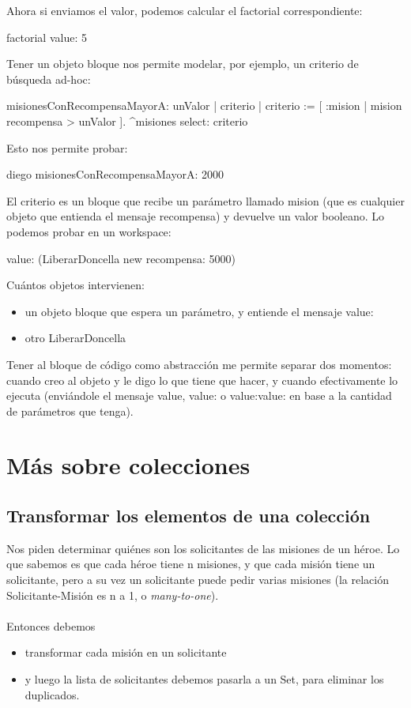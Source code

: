 \documentclass[a4paper,12pt]{book}
\begin{document}
Ahora si enviamos el valor, podemos calcular el factorial correspondiente:

\begin{code}
factorial value: 5
\end{code}

Tener un objeto bloque nos permite modelar, por ejemplo, un criterio de búsqueda ad-hoc:

\begin{code}
misionesConRecompensaMayorA: unValor
  | criterio |
  criterio := [ :mision | mision recompensa > unValor ].
  ^misiones select: criterio 
\end{code}

Esto nos permite probar:

\begin{code}
diego misionesConRecompensaMayorA: 2000
\end{code}

El criterio es un bloque que recibe un parámetro llamado mision (que es cualquier objeto que entienda el mensaje
recompensa) y devuelve un valor booleano. Lo podemos probar en un workspace:

\begin{code}
 value: (LiberarDoncella new recompensa: 5000)
\end{code}

Cuántos objetos intervienen:

\begin{itemize}
 \item un objeto bloque que espera un parámetro, y entiende el mensaje value:
 \item otro LiberarDoncella
\end{itemize}

Tener al bloque de código como abstracción me permite separar dos momentos: cuando creo al objeto y le digo lo
que tiene que hacer, y cuando efectivamente lo ejecuta (enviándole el mensaje value, value: o value:value: en
base a la cantidad de parámetros que tenga).

\section{Más sobre colecciones}

\subsection{Transformar los elementos de una colección}
Nos piden determinar quiénes son los solicitantes de las misiones de un héroe. Lo que sabemos es que cada
héroe tiene n misiones, y que cada misión tiene un solicitante, pero a su vez un solicitante puede pedir
varias misiones (la relación Solicitante-Misión es n a 1, o \textit{many-to-one}).
\\
\\
Entonces debemos
\begin{itemize}
 \item transformar cada misión en un solicitante
 \item y luego la lista de solicitantes debemos pasarla a un Set, para eliminar los duplicados.
\end{itemize}
\end{document}
